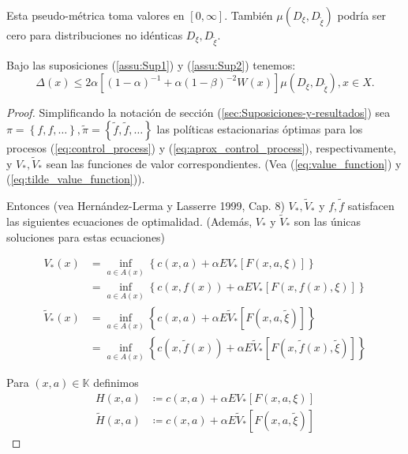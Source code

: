 \documentclass[11pt, spanish]{amsart}
\begin{document}
Esta pseudo-métrica toma valores en $[0,\infty]$. También $\mu\left(D_{\xi},D_{\widetilde{\xi}}\right)$
podría ser cero para distribuciones no idénticas $D_{\xi},D_{\widetilde{\xi}}$.
\begin{thm}
\label{thm:Teo1} Bajo las suposiciones (\ref{assu:Sup1}) y (\ref{assu:Sup2})
tenemos: 
\begin{equation}
\Delta\left(x\right)\leq2\alpha\left[\left(1-\alpha\right)^{-1}+\alpha\left(1-\beta\right)^{-2}W\left(x\right)\right]\mu\left(D_{\xi},D_{\widetilde{\xi}}\right),x\in X.\label{eq:Teo1}
\end{equation}
\end{thm}
%
\begin{proof}
Simplificando la notación de sección (\ref{sec:Suposiciones-y-resultados})
sea $\pi=\left\{ f,f,\ldots\right\} ,\widetilde{\pi}=\left\{ \widetilde{f},\widetilde{f},\ldots\right\} $
las políticas estacionarias óptimas para los procesos (\ref{eq:control_process})
y (\ref{eq:aprox_control_process}), respectivamente, y $V_{*},\widetilde{V}_{*}$
sean las funciones de valor correspondientes. (Vea (\ref{eq:value_function})
y (\ref{eq:tilde_value_function})). 

Entonces (vea Hernández-Lerma y Lasserre 1999, Cap. 8) $V_{*},\widetilde{V}_{*}$
y $f,\widetilde{f}$ satisfacen las siguientes ecuaciones de optimalidad.
(Además, $V_{*}$ y $\widetilde{V}_{*}$ son las únicas soluciones
para estas ecuaciones)

\begin{align}
V_{*}\left(x\right) & =\inf_{a\in A\left(x\right)}\left\{ c\left(x,a\right)+\alpha EV_{*}\left[F\left(x,a,\xi\right)\right]\right\} \nonumber \\
 & =\inf_{a\in A\left(x\right)}\left\{ c\left(x,f\left(x\right)\right)+\alpha EV_{*}\left[F\left(x,f\left(x\right),\xi\right)\right]\right\} \label{eq:proof1vstar}\\
\tilde{V}_{*}\left(x\right) & =\inf_{a\in A\left(x\right)}\left\{ c\left(x,a\right)+\alpha E\widetilde{V}_{*}\left[F\left(x,a,\widetilde{\xi}\right)\right]\right\} \nonumber \\
 & =\inf_{a\in A\left(x\right)}\left\{ c\left(x,\widetilde{f}\left(x\right)\right)+\alpha E\widetilde{V}_{*}\left[F\left(x,\widetilde{f}\left(x\right),\widetilde{\xi}\right)\right]\right\} \label{eq:proof1tilde_vstar}
\end{align}

Para $\left(x,a\right)\in\mathbb{K}$ definimos 
\begin{align}
H\left(x,a\right) & \coloneqq c\left(x,a\right)+\alpha EV_{*}\left[F\left(x,a,\xi\right)\right]\nonumber \\
\widetilde{H}\left(x,a\right) & \coloneqq c\left(x,a\right)+\alpha E\widetilde{V}_{*}\left[F\left(x,a,\widetilde{\xi}\right)\right]\label{eq:Hxa}
\end{align}


\end{proof}
\end{document}
